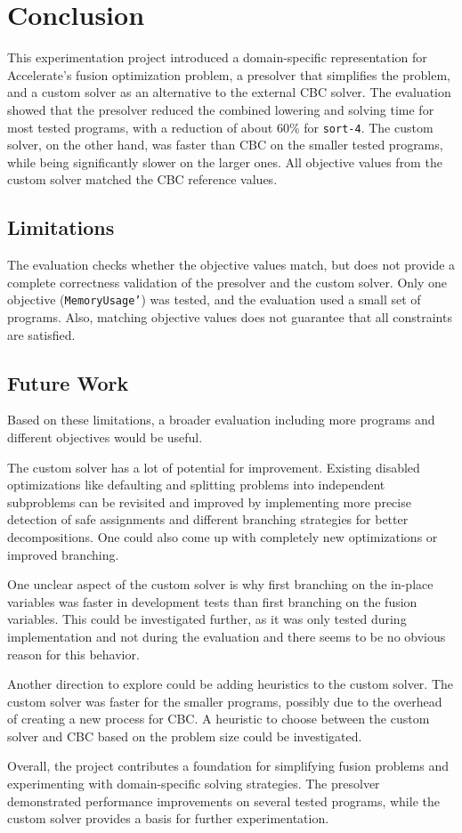 \section{Conclusion}
\label{sec:conclusion}

This experimentation project introduced a domain-specific representation for Accelerate's fusion optimization problem, a presolver that simplifies the problem, and a custom solver as an alternative to the external CBC solver.
The evaluation showed that the presolver reduced the combined lowering and solving time for most tested programs, with a reduction of about 60\% for \texttt{sort-4}.
The custom solver, on the other hand, was faster than CBC on the smaller tested programs, while being significantly slower on the larger ones.
All objective values from the custom solver matched the CBC reference values.

\subsection{Limitations}

The evaluation checks whether the objective values match, but does not provide a complete correctness validation of the presolver and the custom solver.
Only one objective (\texttt{MemoryUsage'}) was tested, and the evaluation used a small set of programs.
Also, matching objective values does not guarantee that all constraints are satisfied.

\subsection{Future Work}

Based on these limitations, a broader evaluation including more programs and different objectives would be useful.

The custom solver has a lot of potential for improvement.
Existing disabled optimizations like defaulting and splitting problems into independent subproblems can be revisited and improved by implementing more precise detection of safe assignments and different branching strategies for better decompositions.
One could also come up with completely new optimizations or improved branching.

One unclear aspect of the custom solver is why first branching on the in-place variables was faster in development tests than first branching on the fusion variables.
This could be investigated further, as it was only tested during implementation and not during the evaluation and there seems to be no obvious reason for this behavior.

Another direction to explore could be adding heuristics to the custom solver.
The custom solver was faster for the smaller programs, possibly due to the overhead of creating a new process for CBC.
A heuristic to choose between the custom solver and CBC based on the problem size could be investigated.

Overall, the project contributes a foundation for simplifying fusion problems and experimenting with domain-specific solving strategies.
The presolver demonstrated performance improvements on several tested programs, while the custom solver provides a basis for further experimentation.
